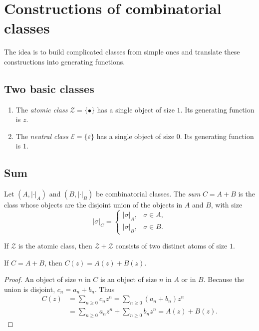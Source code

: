 \section{Constructions of combinatorial classes}
The idea is to build complicated classes from simple ones and translate these constructions into generating functions.

\subsection{Two basic classes}
\begin{enumerate}
\item The \textit{atomic class} $\mathcal Z=\{\bullet\}$ has a single object of size $1$. Its generating function is $z$.
\item The \textit{neutral class} $\mathcal E=\{\varepsilon\}$ has a single object of size $0$. Its generating function is $1$.
\end{enumerate}

\subsection{Sum}
\begin{definition}
Let $(A,|\cdot|_A)$ and $(B,|\cdot|_B)$ be combinatorial classes. The \textit{sum} $C=A+B$ is the class whose objects are the disjoint union of the objects in $A$ and $B$, with size
\[
|\sigma|_C=\begin{cases}|\sigma|_A,&\sigma\in A,\\|\sigma|_B,&\sigma\in B.\end{cases}
\]
\end{definition}
\begin{example}
If $\mathcal Z$ is the atomic class, then $\mathcal Z+\mathcal Z$ consists of two distinct atoms of size $1$.
\end{example}
\begin{lemma}
If $C=A+B$, then $C(z)=A(z)+B(z)$.
\end{lemma}
\begin{proof}
An object of size $n$ in $C$ is an object of size $n$ in $A$ or in $B$. Because the union is disjoint, $c_n=a_n+b_n$. Thus
\begin{align*}
C(z)&=\sum_{n\ge0}c_nz^n
=\sum_{n\ge0}(a_n+b_n)z^n\\
&=\sum_{n\ge0}a_nz^n+\sum_{n\ge0}b_nz^n=A(z)+B(z).
\end{align*}
\end{proof}

